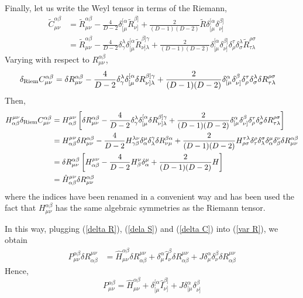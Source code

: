 Finally, let us write the Weyl tensor in terms of the Riemann,
\begin{align*}
    \tilde{C}^{\alpha\beta}_{\mu\nu}&=\tilde{R}^{\alpha\beta}_{\mu\nu}-\frac{4}{D-2}\delta^{[\alpha}_{[\mu}\tilde{R}^{\beta]}_{\nu]}+\frac{2}{(D-1)(D-2)}\tilde{R}\delta^{[\alpha}_{[\mu}\delta^{\beta]}_{\nu]}\\
    &=\tilde{R}^{\alpha\beta}_{\mu\nu}-\frac{4}{D-2}\delta^\lambda_\gamma \delta^{[\alpha}_{[\mu}\tilde{R}^{\beta]\gamma}_{\nu]\lambda}+\frac{2}{(D-1)(D-2)}\delta^{[\alpha}_{[\mu}\delta^{\beta]}_{\nu]}\delta^\tau_\rho\delta^\lambda_\sigma\tilde{R}^{\rho\sigma}_{\tau\lambda}
\end{align*}
Varying with respect to $R^{\alpha\beta}_{\mu\nu}$,
\begin{align*}
    \delta_{\rm Riem}C^{\alpha\beta}_{\mu\nu}&=\delta R^{\alpha\beta}_{\mu\nu}-\frac{4}{D-2}\delta^\lambda_\gamma\delta^{[\alpha}_{[\mu}\delta R^{\beta]\gamma}_{\nu]\lambda}+\frac{2}{(D-1)(D-2)}\delta^\alpha_{[\mu}\delta^\beta_{\nu]}\delta^\tau_\rho\delta^\lambda_\sigma \delta R^{\rho\sigma}_{\tau\lambda}
\end{align*}
Then,
\begin{align}
   \nonumber H^{\mu\nu}_{\alpha\beta}\delta_{\rm Riem}C^{\alpha\beta}_{\mu\nu}&=H^{\mu\nu}_{\alpha\beta}\left[\delta R^{\alpha\beta}_{\mu\nu}-\frac{4}{D-2}\delta^\lambda_\gamma\delta^{[\alpha}_{[\mu}\delta R^{\beta]\gamma}_{\nu]\lambda}+\frac{2}{(D-1)(D-2)}\delta^\alpha_{[\mu}\delta^\beta_{\nu]}\delta^\tau_\rho\delta^\lambda_\sigma \delta R^{\rho\sigma}_{\tau\lambda}\right]\\
    \nonumber&=H^{\mu\nu}_{\alpha\beta}\delta R^{\alpha\beta}_{\mu\nu}-\frac{4}{D-2}H^{\lambda\nu}_{\gamma\beta}\delta^\mu_\alpha\delta^\gamma_\lambda\delta R^{\beta\alpha}_{\nu\mu}+\frac{2}{(D-1)(D-2)}H^{\tau\lambda}_{\rho\sigma}\delta^\rho_\tau\delta^\sigma_\lambda \delta^\mu_\alpha\delta^\nu_\beta\delta R^{\alpha\beta}_{\mu\nu}\\
    \nonumber&=\delta R^{\alpha\beta}_{\mu\nu}\left[H^{\mu\nu}_{\alpha\beta}-\frac{4}{D-2}H^\nu_\beta \delta^\mu_\alpha +\frac{2}{(D-1)(D-2)}H\right]\\
    &=\hat{H}^{\mu\nu}_{\alpha\beta}\delta R^{\alpha\beta}_{\mu\nu}\label{delta C}
\end{align}
where the indices have been renamed in a convenient way and has been used the fact that $H^{\alpha\beta}_{\mu\nu}$ has the same algebraic symmetries as the Riemann tensor. 

In this way, plugging (\ref{delta R}), (\ref{dela S}) and (\ref{delta C}) into (\ref{var R}), we obtain
\begin{align*}
    P^{\alpha\beta}_{\mu\nu}\delta R^{\mu\nu}_{\alpha\beta}&=\hat{H}^{\alpha\beta}_{\mu\nu}\delta R^{\mu\nu}_{\alpha\beta}+\delta^\alpha_\mu\hat{I}^\beta_\nu\delta R^{\mu\nu}_{\alpha\beta}+J\delta^\alpha_\mu\delta^\beta_\nu\delta R^{\mu\nu}_{\alpha\beta}
\end{align*}
Hence,
\begin{equation}\label{P-tensor}
    P^{\alpha\beta}_{\mu\nu}=\hat{H}^{\alpha\beta}_{\mu\nu}+\delta^{[\alpha}_{[\mu}\hat{I}^{\beta]}_{\nu]}+J\delta^\alpha_{[\mu}\delta^\beta_{\nu]}
\end{equation}

